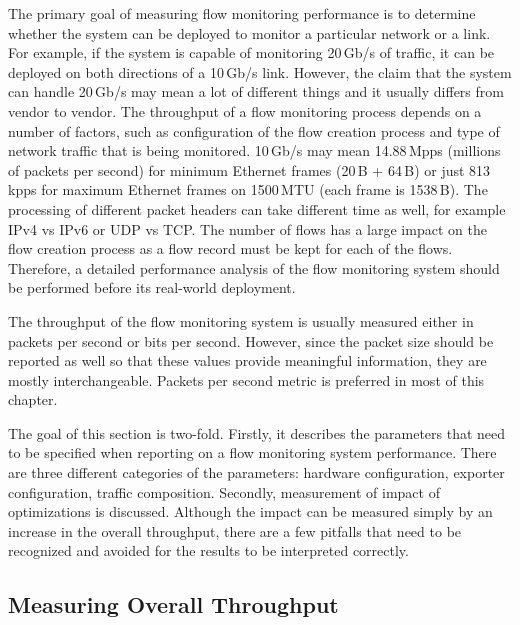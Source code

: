 The primary goal of measuring flow monitoring performance is to determine whether the system can be deployed to monitor a particular network or a link. For example, if the system is capable of monitoring 20\,Gb/s of traffic, it can be deployed on both directions of a 10\,Gb/s link. However, the claim that the system can handle 20\,Gb/s may mean a lot of different things and it usually differs from vendor to vendor. The throughput of a flow monitoring process depends on a number of factors, such as configuration of the flow creation process and type of network traffic that is being monitored. 10\,Gb/s may mean 14.88\,Mpps (millions of packets per second) for minimum Ethernet frames (20\,B + 64\,B) or just 813\,kpps for maximum Ethernet frames on 1500\,MTU (each frame is 1538\,B). The processing of different packet headers can take different time as well, for example IPv4 vs IPv6 or UDP vs TCP. The number of flows has a large impact on the flow creation process as a flow record must be kept for each of the flows. Therefore, a detailed performance analysis of the flow monitoring system should be performed before its real-world deployment.

The throughput of the flow monitoring system is usually measured either in packets per second or bits per second. However, since the packet size should be reported as well so that these values provide meaningful information, they are mostly interchangeable. Packets per second metric is preferred in most of this chapter.

The goal of this section is two-fold. Firstly, it describes the parameters that need to be specified when reporting on a flow monitoring system performance. There are three different categories of the parameters: hardware configuration, exporter configuration, traffic composition. Secondly, measurement of impact of optimizations is discussed. Although the impact can be measured simply by an increase in the overall throughput, there are a few pitfalls that need to be recognized and avoided for the results to be interpreted correctly.


\subsection{Measuring Overall Throughput}

